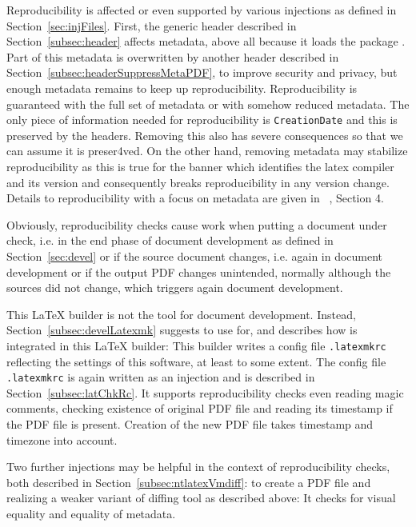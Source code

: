 Reproducibility is affected or even supported by various injections 
as defined in Section~\ref{sec:injFiles}. 
First, the generic header described in Section~\ref{subsec:header} 
affects metadata, above all because it loads the package . 
Part of this metadata is overwritten by another header 
described in Section~\ref{subsec:headerSuppressMetaPDF}, 
to improve security and privacy, 
but enough metadata remains to keep up reproducibility. 
Reproducibility is guaranteed with the full set of metadata 
or with somehow reduced metadata. 
The only piece of information needed for reproducibility is \texttt{CreationDate} 
and this is preserved by the headers. 
Removing this also has severe consequences 
so that we can assume it is preser4ved. 
On the other hand, removing metadata may stabilize reproducibility 
as this is true for the banner which identifies the latex compiler and its version 
and consequently breaks reproducibility in any version change. 
Details to reproducibility with a focus on metadata are given in ~\cite{LatexGen}, Section 4. 

Obviously, reproducibility checks cause work 
when putting a document under check, 
i.e. in the end phase of document development 
as defined in Section~\ref{sec:devel}
or if the source document changes, i.e. again in document development 
or if the output PDF changes unintended, 
normally although the sources did not change, 
which triggers again document development. 

This \LaTeX{} builder is not the tool for document development. 
Instead, Section~\ref{subsec:develLatexmk} suggests to use  for, 
and describes how  is integrated in this \LaTeX{} builder: 
This builder writes a config file \texttt{.latexmkrc} 
reflecting the settings of this software, at least to some extent. 
The config file \texttt{.latexmkrc} is again written as an injection 
and is described in Section~\ref{subsec:latChkRc}. 
It supports reproducibility checks even reading magic comments, 
checking existence of original PDF file 
and reading its timestamp if the PDF file is present. 
Creation of the new PDF file takes timestamp and timezone into account. 

Two further injections may be helpful in the context of reproducibility checks, 
both described in Section~\ref{subsec:ntlatexVmdiff}: 
 to create a PDF file and  
realizing a weaker variant of diffing tool as described above: 
It checks for visual equality and equality of metadata. 
\medskip


